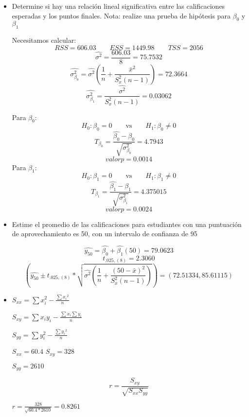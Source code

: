 \documentclass{../oxmathproblems}
\begin{document}
\begin{questions}
\begin{itemize}
\newpage

\item Determine si hay una relación lineal significativa entre las calificaciones esperadas y los puntos finales. Nota: realize una prueba de hipótesis para $\beta_0$ y $\beta_1$

Necesitamos calcular:
$$ RSS = 606.03 \qquad ESS = 1449.98 \qquad TSS = 2056$$
$$ \hat{\sigma^2} = \frac{606.03}{8} = 75.7532$$
$$ \hat{\sigma_{\beta_0}^2}= \hat{\sigma^2}\left(\frac{1}{n}+\frac{\bar{x}^2}{S_x^2 (n-1)}\right)  = 72.3664$$
$$ \hat{\sigma_{\beta_1}^2}= \frac{\hat{\sigma^2}}{S_x^2 (n-1)} = 0.03062$$

Para $\beta_0$:
$$ H_0:\beta_0 = 0  \qquad \text{vs} \qquad H_1:\beta_0 \neq 0 $$
$$ T_{\beta_0} = \frac{\hat{\beta_{0}}-\beta_0}{\sqrt{\sigma^2_{\beta_0}}} = 4.7943$$ 
$$ valorp = 0.0014 $$ 
Para $\beta_1$:
$$ H_0:\beta_1 = 0  \qquad \text{vs} \qquad H_1:\beta_1 \neq 0 $$
$$ T_{\beta_1} = \frac{\hat{\beta_{1}}-\beta_1}{\sqrt{\sigma^2_{\beta_1}}} = 4.375015$$ 
$$ valorp = 0.0024 $$

\item Estime el promedio de las calificaciones para estudiantes con una puntuación de aprovechamiento es 50, con un intervalo de confianza de 95%

$$\hat{y_{50}} = \hat{\beta_0}+\hat{\beta_1}(50) = 79.0623$$
$$ t_{.025, (8)} = 2.3060$$
$$\left(\hat{y_{50}} \pm t_{.025, (8)}*\sqrt{\hat{\sigma^2}\left(\frac{1}{n}+\frac{(50-\bar{x})^2}{S_x^2 (n-1)}\right)}\right) = (72.51334, 85.61115)$$

\end{itemize}

\miquestion 
\begin{itemize}
\item 


$ S_{xx} = \sum{x_i^2} - \frac{\sum{x_i}^2}{n}$  

$ S_{xy} = \sum{x_iy_i} - \frac{\sum{x_i}\sum{y_i}}{n} $

$ S_{yy} = \sum{y_i^2} - \frac{\sum{y_i}^2}{n}$  

$S_{xx} = 60.4$ 
$S_{xy} = 328 $ 

$S_{yy} = 2610 $

$$ r = \frac{S_{xy}}{ \sqrt{S_{xx}S_{yy}}}   $$ 


$r = \frac{328}{\sqrt{60.4*2610}} = 0.8261 $ 



\end{itemize}
\end{questions}
\end{document}
